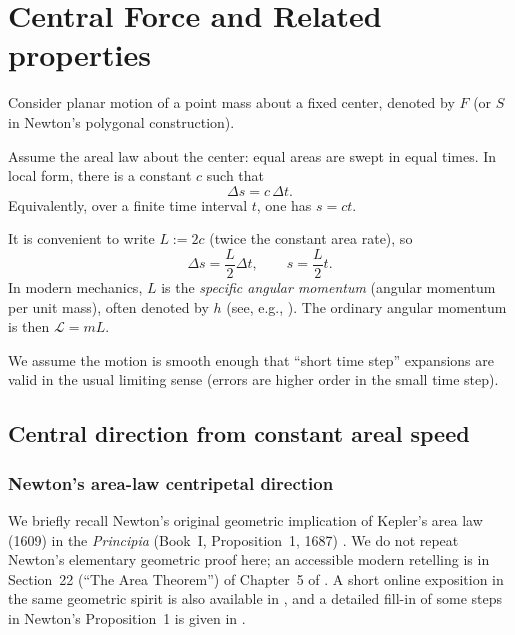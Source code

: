 \section{Central Force and Related properties}

Consider planar motion of a point mass about a fixed center, denoted by $F$ (or $S$ in Newton's polygonal construction).

Assume the areal law about the center: equal areas are swept in equal times. In local form, there is a constant $c$ such that
\begin{equation}
  \Delta s = c\,\Delta t.
\end{equation}
Equivalently, over a finite time interval $t$, one has $s=ct$.

It is convenient to write $L:=2c$ (twice the constant area rate), so
\begin{equation}
  \Delta s=\frac{L}{2}\Delta t,
  \qquad
  s=\frac{L}{2}t.
\end{equation}
In modern mechanics, $L$ is the \emph{specific angular momentum} (angular momentum per unit mass), often denoted by $h$ (see, e.g., \cite{chandrasekhar1995principia,goodstein1996feynman}). The ordinary angular momentum is then $\mathcal{L}=mL$.

We assume the motion is smooth enough that ``short time step'' expansions are valid in the usual limiting sense (errors are higher order in the small time step).
\subsection{Central direction from constant areal speed}

\subsubsection{Newton's area-law centripetal direction}
\label{subsec:central-direction}

We briefly recall Newton's original geometric implication of Kepler's area law (1609) in the \emph{Principia} (Book~I, Proposition~1, 1687) \cite{newton1846mottewikisource}. We do not repeat Newton's elementary geometric proof here; an accessible modern retelling is in Section~22 (``The Area Theorem'') of Chapter~5 of \cite{chandrasekhar1995principia}. A short online exposition in the same geometric spirit is also available in \cite{nonagonnewtonkepler}, and a detailed fill-in of some steps in Newton's Proposition~1 is given in \cite{nauenberg2003keplerarea}.

